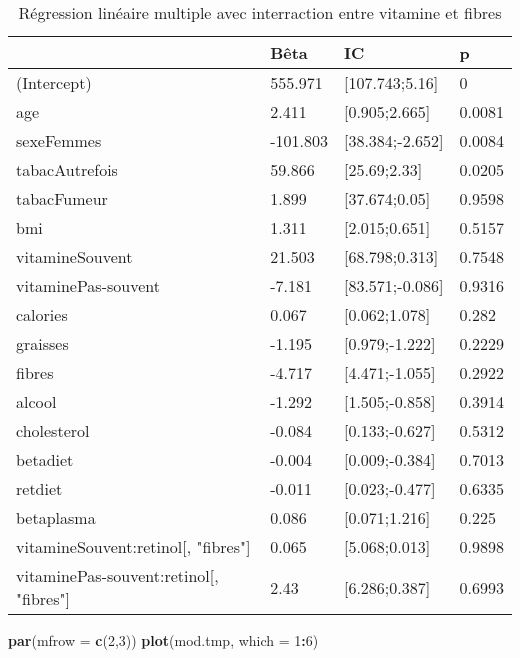 \documentclass[]{article}
\newenvironment{Shaded}{\begin{snugshade}}{\end{snugshade}}
\newcommand{\KeywordTok}[1]{\textcolor[rgb]{0.13,0.29,0.53}{\textbf{#1}}}
\newcommand{\DataTypeTok}[1]{\textcolor[rgb]{0.13,0.29,0.53}{#1}}
\newcommand{\DecValTok}[1]{\textcolor[rgb]{0.00,0.00,0.81}{#1}}
\newcommand{\OperatorTok}[1]{\textcolor[rgb]{0.81,0.36,0.00}{\textbf{#1}}}
\newcommand{\NormalTok}[1]{#1}
\begin{document}
\begin{table}

\caption{\label{tab:unnamed-chunk-73}Régression linéaire multiple avec interraction entre vitamine et fibres}
\centering
\begin{tabular}[t]{l|l|l|l}
\hline
  & Bêta & IC & p\\
\hline
\rowcolor[HTML]{BBD2E1}  (Intercept) & 555.971 & [107.743;5.16] & 0\\
\hline
age & 2.411 & [0.905;2.665] & 0.0081\\
\hline
\rowcolor[HTML]{BBD2E1}  sexeFemmes & -101.803 & [38.384;-2.652] & 0.0084\\
\hline
tabacAutrefois & 59.866 & [25.69;2.33] & 0.0205\\
\hline
\rowcolor[HTML]{BBD2E1}  tabacFumeur & 1.899 & [37.674;0.05] & 0.9598\\
\hline
bmi & 1.311 & [2.015;0.651] & 0.5157\\
\hline
\rowcolor[HTML]{BBD2E1}  vitamineSouvent & 21.503 & [68.798;0.313] & 0.7548\\
\hline
vitaminePas-souvent & -7.181 & [83.571;-0.086] & 0.9316\\
\hline
\rowcolor[HTML]{BBD2E1}  calories & 0.067 & [0.062;1.078] & 0.282\\
\hline
graisses & -1.195 & [0.979;-1.222] & 0.2229\\
\hline
\rowcolor[HTML]{BBD2E1}  fibres & -4.717 & [4.471;-1.055] & 0.2922\\
\hline
alcool & -1.292 & [1.505;-0.858] & 0.3914\\
\hline
\rowcolor[HTML]{BBD2E1}  cholesterol & -0.084 & [0.133;-0.627] & 0.5312\\
\hline
betadiet & -0.004 & [0.009;-0.384] & 0.7013\\
\hline
\rowcolor[HTML]{BBD2E1}  retdiet & -0.011 & [0.023;-0.477] & 0.6335\\
\hline
betaplasma & 0.086 & [0.071;1.216] & 0.225\\
\hline
\rowcolor[HTML]{BBD2E1}  vitamineSouvent:retinol[, "fibres"] & 0.065 & [5.068;0.013] & 0.9898\\
\hline
vitaminePas-souvent:retinol[, "fibres"] & 2.43 & [6.286;0.387] & 0.6993\\
\hline
\end{tabular}
\end{table}

\begin{Shaded}
\begin{Highlighting}[]
\KeywordTok{par}\NormalTok{(}\DataTypeTok{mfrow =} \KeywordTok{c}\NormalTok{(}\DecValTok{2}\NormalTok{,}\DecValTok{3}\NormalTok{))}
\KeywordTok{plot}\NormalTok{(mod.tmp, }\DataTypeTok{which =} \DecValTok{1}\OperatorTok{:}\DecValTok{6}\NormalTok{)}
\end{Highlighting}
\end{Shaded}
\end{document}
